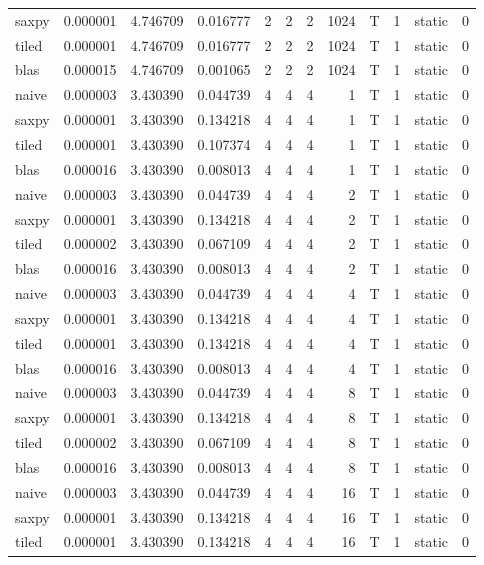\documentclass[
  12pt,
  xcolor = usenames,dvipsnames]{article}
\begin{document}
\begin{table}[!h]
{\begin{tabular}[t]{lrrrrrrrlrlr}
saxpy & 0.000001 & 4.746709 & 0.016777 & 2 & 2 & 2 & 1024 & T & 1 & static & 0\\
tiled & 0.000001 & 4.746709 & 0.016777 & 2 & 2 & 2 & 1024 & T & 1 & static & 0\\
blas & 0.000015 & 4.746709 & 0.001065 & 2 & 2 & 2 & 1024 & T & 1 & static & 0\\
naive & 0.000003 & 3.430390 & 0.044739 & 4 & 4 & 4 & 1 & T & 1 & static & 0\\
\addlinespace
saxpy & 0.000001 & 3.430390 & 0.134218 & 4 & 4 & 4 & 1 & T & 1 & static & 0\\
tiled & 0.000001 & 3.430390 & 0.107374 & 4 & 4 & 4 & 1 & T & 1 & static & 0\\
blas & 0.000016 & 3.430390 & 0.008013 & 4 & 4 & 4 & 1 & T & 1 & static & 0\\
naive & 0.000003 & 3.430390 & 0.044739 & 4 & 4 & 4 & 2 & T & 1 & static & 0\\
saxpy & 0.000001 & 3.430390 & 0.134218 & 4 & 4 & 4 & 2 & T & 1 & static & 0\\
\addlinespace
tiled & 0.000002 & 3.430390 & 0.067109 & 4 & 4 & 4 & 2 & T & 1 & static & 0\\
blas & 0.000016 & 3.430390 & 0.008013 & 4 & 4 & 4 & 2 & T & 1 & static & 0\\
naive & 0.000003 & 3.430390 & 0.044739 & 4 & 4 & 4 & 4 & T & 1 & static & 0\\
saxpy & 0.000001 & 3.430390 & 0.134218 & 4 & 4 & 4 & 4 & T & 1 & static & 0\\
tiled & 0.000001 & 3.430390 & 0.134218 & 4 & 4 & 4 & 4 & T & 1 & static & 0\\
\addlinespace
blas & 0.000016 & 3.430390 & 0.008013 & 4 & 4 & 4 & 4 & T & 1 & static & 0\\
naive & 0.000003 & 3.430390 & 0.044739 & 4 & 4 & 4 & 8 & T & 1 & static & 0\\
saxpy & 0.000001 & 3.430390 & 0.134218 & 4 & 4 & 4 & 8 & T & 1 & static & 0\\
tiled & 0.000002 & 3.430390 & 0.067109 & 4 & 4 & 4 & 8 & T & 1 & static & 0\\
blas & 0.000016 & 3.430390 & 0.008013 & 4 & 4 & 4 & 8 & T & 1 & static & 0\\
\addlinespace
naive & 0.000003 & 3.430390 & 0.044739 & 4 & 4 & 4 & 16 & T & 1 & static & 0\\
saxpy & 0.000001 & 3.430390 & 0.134218 & 4 & 4 & 4 & 16 & T & 1 & static & 0\\
tiled & 0.000001 & 3.430390 & 0.134218 & 4 & 4 & 4 & 16 & T & 1 & static & 0\\

\end{tabular}}
\end{table}
\end{document}
